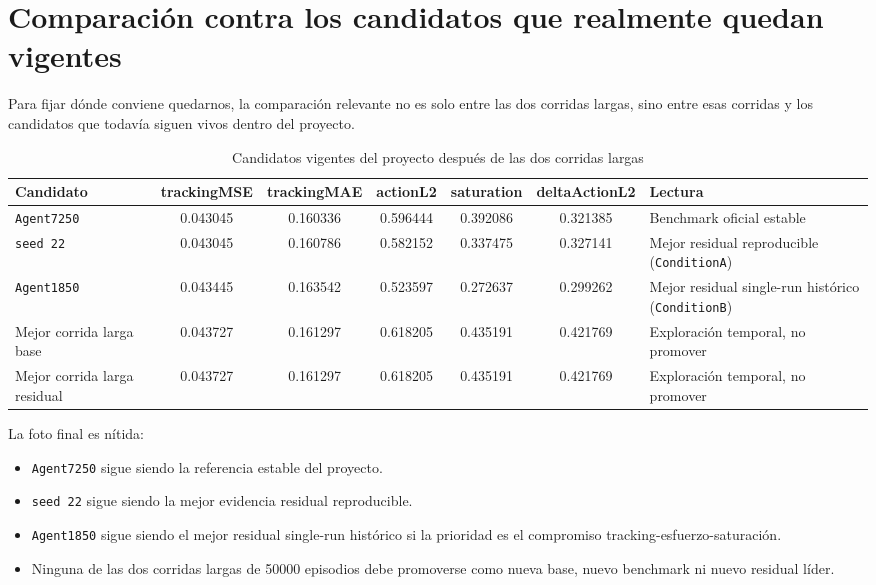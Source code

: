 \documentclass[11pt,a4paper]{article}
\begin{document}
\section*{Comparaci\'on contra los candidatos que realmente quedan vigentes}
Para fijar d\'onde conviene quedarnos, la comparaci\'on relevante no es solo entre las dos corridas largas, sino entre esas corridas y los candidatos que todav\'ia siguen vivos dentro del proyecto.

\begin{table}[H]
\centering
\caption{Candidatos vigentes del proyecto despu\'es de las dos corridas largas}
\label{tab:project_state}
\scriptsize
\begin{tabularx}{\linewidth}{>{\raggedright\arraybackslash}p{2.25cm} c c c c c >{\raggedright\arraybackslash}p{2.55cm}}
\toprule
Candidato & trackingMSE & trackingMAE & actionL2 & saturation & deltaActionL2 & Lectura \\
\midrule
\texttt{Agent7250} & 0.043045 & 0.160336 & 0.596444 & 0.392086 & 0.321385 & Benchmark oficial estable \\
\texttt{seed 22} & 0.043045 & 0.160786 & 0.582152 & 0.337475 & 0.327141 & Mejor residual reproducible (\texttt{ConditionA}) \\
\texttt{Agent1850} & 0.043445 & 0.163542 & 0.523597 & 0.272637 & 0.299262 & Mejor residual single-run hist\'orico (\texttt{ConditionB}) \\
Mejor corrida larga base & 0.043727 & 0.161297 & 0.618205 & 0.435191 & 0.421769 & Exploraci\'on temporal, no promover \\
Mejor corrida larga residual & 0.043727 & 0.161297 & 0.618205 & 0.435191 & 0.421769 & Exploraci\'on temporal, no promover \\
\bottomrule
\end{tabularx}
\end{table}

La foto final es n\'itida:
\begin{itemize}
    \item \texttt{Agent7250} sigue siendo la referencia estable del proyecto.
    \item \texttt{seed 22} sigue siendo la mejor evidencia residual reproducible.
    \item \texttt{Agent1850} sigue siendo el mejor residual single-run hist\'orico si la prioridad es el compromiso tracking-esfuerzo-saturaci\'on.
    \item Ninguna de las dos corridas largas de 50000 episodios debe promoverse como nueva base, nuevo benchmark ni nuevo residual l\'ider.
\end{itemize}
\end{document}
